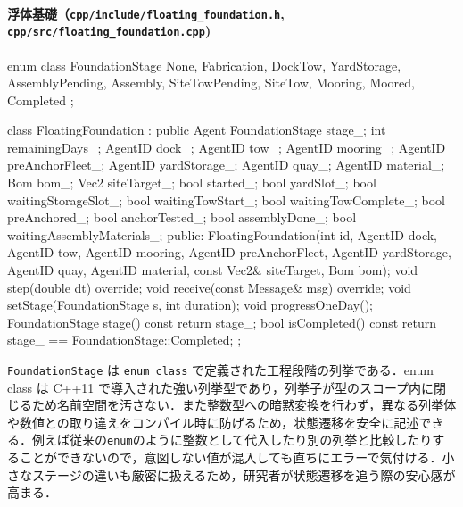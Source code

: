 \documentclass[10pt,letterpaper]{jsarticle}
\begin{document}
\paragraph{浮体基礎（\texttt{cpp/include/floating\_foundation.h}, \texttt{cpp/src/floating\_foundation.cpp})}
\begin{cppcode}
enum class FoundationStage {
    None,
    Fabrication,
    DockTow,
    YardStorage,
    AssemblyPending,
    Assembly,
    SiteTowPending,
    SiteTow,
    Mooring,
    Moored,
    Completed
};

class FloatingFoundation : public Agent {
    FoundationStage stage_;
    int remainingDays_;
    AgentID dock_;
    AgentID tow_;
    AgentID mooring_;
    AgentID preAnchorFleet_;
    AgentID yardStorage_;
    AgentID quay_;
    AgentID material_;
    Bom bom_;
    Vec2 siteTarget_;
    bool started_;
    bool yardSlot_;
    bool waitingStorageSlot_;
    bool waitingTowStart_;
    bool waitingTowComplete_;
    bool preAnchored_;
    bool anchorTested_;
    bool assemblyDone_;
    bool waitingAssemblyMaterials_;
public:
    FloatingFoundation(int id, AgentID dock, AgentID tow, AgentID mooring,
                       AgentID preAnchorFleet, AgentID yardStorage,
                       AgentID quay, AgentID material,
                       const Vec2& siteTarget, Bom bom);
    void step(double dt) override;
    void receive(const Message& msg) override;
    void setStage(FoundationStage s, int duration);
    void progressOneDay();
    FoundationStage stage() const { return stage_; }
    bool isCompleted() const { return stage_ == FoundationStage::Completed; }
};
\end{cppcode}

\noindent\texttt{FoundationStage} は \texttt{enum class} で定義された工程段階の列挙である．enum class は C++11 で導入された強い列挙型であり，列挙子が型のスコープ内に閉じるため名前空間を汚さない．また整数型への暗黙変換を行わず，異なる列挙体や数値との取り違えをコンパイル時に防げるため，状態遷移を安全に記述できる．例えば従来の\texttt{enum}のように整数として代入したり別の列挙と比較したりすることができないので，意図しない値が混入しても直ちにエラーで気付ける．小さなステージの違いも厳密に扱えるため，研究者が状態遷移を追う際の安心感が高まる．
\end{document}
